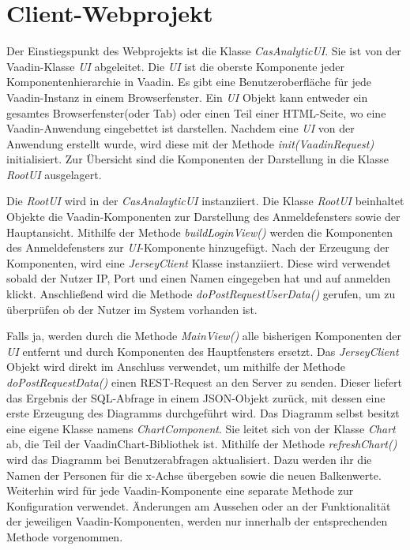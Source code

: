 \section{Client-Webprojekt}
\label{ch:Umsetzung:sec:clientwar}

Der Einstiegspunkt des Webprojekts ist die Klasse \textit{CasAnalyticUI}. Sie ist von der Vaadin-Klasse \textit{UI} abgeleitet. Die \textit{UI} ist die oberste Komponente jeder Komponentenhierarchie in Vaadin. Es gibt eine Benutzeroberfläche für jede Vaadin-Instanz in einem Browserfenster. Ein \textit{UI} Objekt kann entweder ein gesamtes Browserfenster(oder Tab) oder einen Teil einer HTML-Seite, wo eine Vaadin-Anwendung eingebettet ist darstellen. Nachdem eine \textit{UI} von der Anwendung erstellt wurde, wird diese mit der Methode \textit{init(VaadinRequest)} initialisiert. Zur Übersicht sind die Komponenten der Darstellung in die Klasse \textit{RootUI} ausgelagert. 

Die \textit{RootUI} wird in der \textit{CasAnalayticUI} instanziiert. Die Klasse \textit{RootUI} beinhaltet Objekte die Vaadin-Komponenten zur Darstellung des Anmeldefensters sowie der Hauptansicht. Mithilfe der Methode \textit{buildLoginView()} werden die Komponenten des Anmeldefensters zur \textit{UI}-Komponente hinzugefügt. Nach der Erzeugung der Komponenten, wird eine \textit{JerseyClient} Klasse instanziiert. Diese wird verwendet sobald der Nutzer IP, Port und einen Namen eingegeben hat und auf anmelden klickt. Anschließend wird die Methode \textit{doPostRequestUserData()} gerufen, um zu überprüfen ob der Nutzer im System vorhanden ist. 

Falls ja, werden durch die Methode \textit{MainView()} alle bisherigen Komponenten der \textit{UI} entfernt und durch Komponenten des Hauptfensters ersetzt. Das \textit{JerseyClient} Objekt wird direkt im Anschluss verwendet, um mithilfe der Methode \textit{doPostRequestData()} einen REST-Request an den Server zu senden. Dieser liefert das Ergebnis der SQL-Abfrage in einem JSON-Objekt zurück, mit dessen eine erste Erzeugung des Diagramms durchgeführt wird. Das Diagramm selbst besitzt eine eigene Klasse namens \textit{ChartComponent}. Sie leitet sich von der Klasse \textit{Chart} ab, die Teil der VaadinChart-Bibliothek ist. Mithilfe der Methode \textit{refreshChart()} wird das Diagramm bei Benutzerabfragen aktualisiert. Dazu werden ihr die Namen der Personen für die x-Achse übergeben sowie die neuen Balkenwerte. Weiterhin wird für jede Vaadin-Komponente eine separate Methode zur Konfiguration verwendet. Änderungen am Aussehen oder an der Funktionalität der jeweiligen Vaadin-Komponenten, werden nur innerhalb der entsprechenden Methode vorgenommen.

